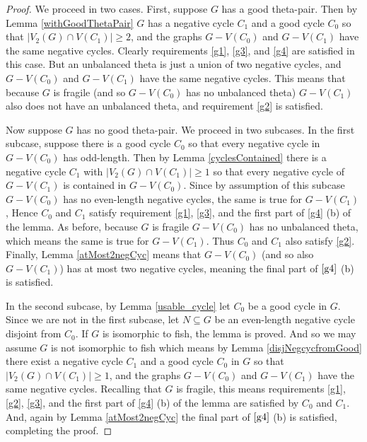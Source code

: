 \documentclass[12pt]{article}
\begin{document}
\begin{proof}
We proceed in two cases. First, suppose $G$ has a good theta-pair. Then by Lemma \ref{withGoodThetaPair} $G$ has a negative cycle $C_1$ and a good cycle $C_0$ so that $|V_2(G) \cap V(C_1)| \ge 2$, and the graphs $G - V(C_0)$ and $G - V(C_1)$ have the same negative cycles. Clearly requirements \ref{g1}, \ref{g3}, and \ref{g4} are satisfied in this case. But an unbalanced theta is just a union of two negative cycles, and $G - V(C_0)$ and $G - V(C_1)$ have the same negative cycles. This means that because $G$ is fragile (and so $G - V(C_0)$ has no unbalanced theta) $G- V(C_1)$ also does not have an unbalanced theta, and requirement \ref{g2} is satisfied.

Now suppose $G$ has no good theta-pair. We proceed in two subcases.
In the first subcase, suppose there is a good cycle $C_0$ so that every negative cycle in $G - V(C_0)$ has odd-length. Then by Lemma \ref{cyclesContained} there is a negative cycle $C_1$ with $|V_2(G) \cap V(C_1)| \ge 1$ so that every negative cycle of $G - V(C_1)$ is contained in $G - V(C_0)$. Since by assumption of this subcase $G - V(C_0)$ has no even-length negative cycles, the same is true for $G - V(C_1)$, Hence $C_0$ and $C_1$ satisfy requirement \ref{g1}, \ref{g3}, and the first part of \ref{g4} (b) of the lemma. As before, because $G$ is fragile $G- V(C_0)$ has no unbalanced theta, which means the same is true for $G-V(C_1)$. Thus $C_0$ and $C_1$ also satisfy \ref{g2}. Finally, Lemma \ref{atMost2negCyc} means that $G - V(C_0)$ (and so also $G - V(C_1)$) has at most two negative cycles, meaning the final part of $\ref{g4}$ (b) is satisfied.

In the second subcase, by Lemma \ref{usable_cycle} let $C_0$ be a good cycle in $G$. Since we are not in the first subcase, let $N \subseteq G$ be an even-length negative cycle disjoint from $C_0$. If $G$ is isomorphic to fish, the lemma is proved. And so we may assume $G$ is not isomorphic to fish which means by Lemma \ref{disjNegcycfromGood} there exist a negative cycle $C_1$ and a good cycle $C_0$ in $G$ so that $|V_2(G) \cap V(C_1)| \ge 1$, and the graphs $G - V(C_0)$ and $G - V(C_1)$ have the same negative cycles. Recalling that $G$ is fragile, this means requirements \ref{g1}, \ref{g2}, \ref{g3}, and the first part of \ref{g4} (b) of the lemma are satisfied by $C_0$ and $C_1$. And, again by Lemma \ref{atMost2negCyc} the final part of $\ref{g4}$ (b) is satisfied, completing the proof.
\end{proof}
\end{document}
